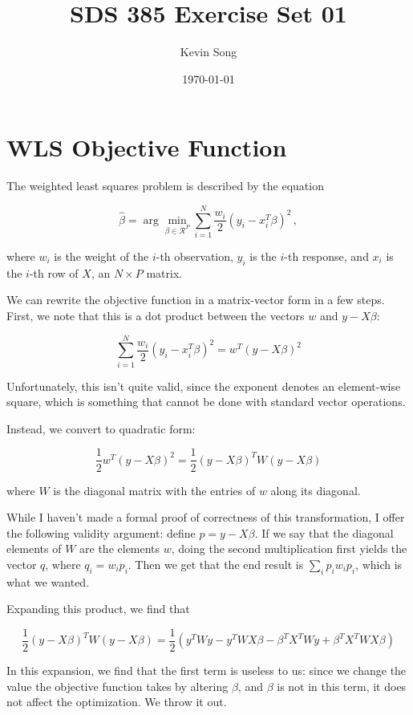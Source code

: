 \documentclass{article}
\title{SDS 385 Exercise Set 01}
\author{Kevin Song}
\date{\today}
\begin{document}
\maketitle

\section{WLS Objective Function}

The weighted least squares problem is described by the equation

\[
\hat{\beta} = \arg \min_{\beta \in \mathcal{R}^P} \sum_{i=1}^N \frac{w_i}{2}(y_i
- x_i^T \beta)^2 \, ,
\]

where $w_i$ is the weight of the $i$-th observation, $y_i$ is the $i$-th
response, and $x_i$ is the $i$-th row of $X$, an $N \times P$ matrix.

We can rewrite the objective function in a matrix-vector form in a few steps. First, we note that
this is a dot product between the vectors $w$ and $y - X\beta$:

\[
 \sum_{i=1}^N \frac{w_i}{2}(y_i - x_i^T \beta)^2 = w^T (y - X\beta)^2
\]

Unfortunately, this isn't quite valid, since the exponent denotes an
element-wise square, which is something that cannot be done with standard vector
operations.

Instead, we convert to quadratic form:

\[
\frac{1}{2} w^T (y - X\beta)^2 =\frac{1}{2} (y - X\beta)^T W (y - X\beta) 
\]

where $W$ is the diagonal matrix with the entries of $w$ along its diagonal.

While I haven't made a formal proof of correctness of this transformation, I
offer the following validity argument: define $p = y - X\beta$. If we say that
the diagonal elements of $W$ are the elements $w$, doing the second multiplication
first yields the vector $q$, where $q_i = w_ip_i$. Then we get that the end
result is $\sum_i p_i w_i p_i$, which is what we wanted.

Expanding this product, we find that

\[
  \frac{1}{2} (y - X\beta)^T W (y - X\beta) =
  \frac{1}{2} \left( y^TWy - y^TWX\beta - \beta^TX^TWy + \beta^TX^TWX\beta \right) 
\]

In this expansion, we find that the first term is useless to us: since we change
the value the objective function takes by altering $\beta$, and $\beta$ is not
in this term, it does not affect the optimization. We throw it out.
\end{document}
